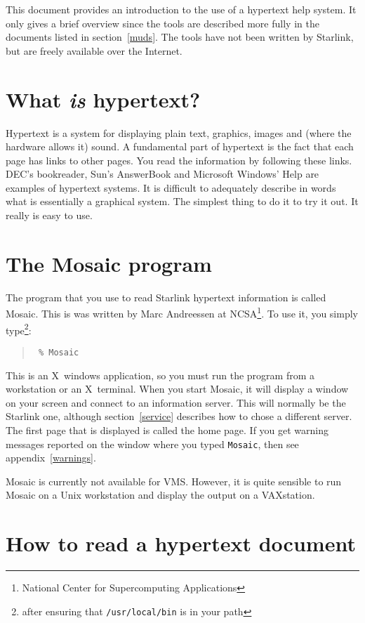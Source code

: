 This document provides an introduction to the use of a hypertext help
system. It only gives a brief overview since the tools are described more
fully in the documents listed in section~\ref{muds}. The tools have not been
written by Starlink, but are freely available over the Internet.

\section{What {\em is} hypertext?}

Hypertext is a system for displaying plain text, graphics, images and (where
the hardware allows it) sound. A fundamental part of hypertext is the fact that
each page has links to other pages. You read the information by following these
links. DEC's bookreader, Sun's AnswerBook and Microsoft Windows' Help are
examples of hypertext systems. It is difficult to adequately describe in words
what is essentially a graphical system. The simplest thing to do it to try it
out. It really is easy to use.

\section{The Mosaic program}

The program that you use to read Starlink hypertext information is called
Mosaic. This is was written by Marc Andreessen at NCSA\footnote{National Center
for Supercomputing Applications}. To use it, you simply type\footnote{after
ensuring that {\tt /usr/local/bin} is in your path}:

\begin{quote}{\tt
\% Mosaic
}
\end{quote}

This is an X~windows application, so you must run the program from a
workstation or an X~terminal. When you start Mosaic, it will display a window
on your screen and connect to an information server. This will normally be the
Starlink one, although section~\ref{service} describes how to chose a different
server. The first page that is displayed is called the home page. If you get
warning messages reported on the window where you typed {\tt Mosaic}, then see
appendix~\ref{warnings}.

Mosaic is currently not available for VMS. However, it is quite sensible to
run Mosaic on a Unix workstation and display the output on a VAXstation.

\section{How to read a hypertext document}


